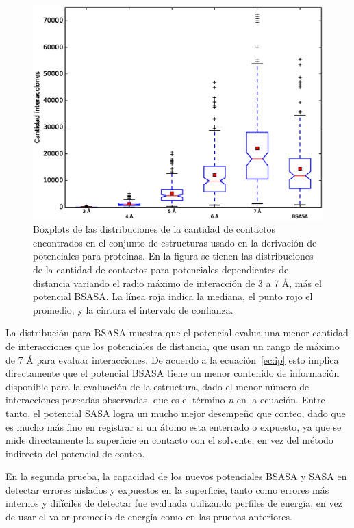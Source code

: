 \begin{figure}[!p]
\centering
\includegraphics[width=\linewidth]{figures/radii_int.eps}
\caption[Boxplots de las distribuciones de la cantidad de contactos encontrados en el conjunto de estructuras usado en la derivación de potenciales para proteínas.]{Boxplots de las distribuciones de la cantidad de contactos encontrados en el conjunto de estructuras usado en la derivación de potenciales para proteínas. En la figura se tienen las distribuciones de la cantidad de contactos para potenciales dependientes de distancia variando el radio máximo de interacción de 3 a 7 \si{\angstrom}, más el potencial BSASA. La línea roja indica la mediana, el punto rojo el promedio, y la cintura el intervalo de confianza.}
\label{fig:radii_int}
\end{figure}
La distribución para BSASA muestra que el potencial evalua una menor cantidad de interacciones que los potenciales de distancia, que usan un rango de máximo de 7 \si{\angstrom} para evaluar interacciones.
De acuerdo a la ecuación~\ref{ec:ip} esto implica directamente que el potencial BSASA tiene un menor contenido de información disponible para la evaluación de la estructura, dado el menor número de interacciones pareadas observadas, que es el término \textit{n} en la ecuación.
Entre tanto, el potencial SASA logra un mucho mejor desempeño que conteo, dado que es mucho más fino en registrar si un átomo esta enterrado o expuesto, ya que se mide directamente la superficie en contacto con el solvente, en vez del método indirecto del potencial de conteo.
\par
En la segunda prueba, la capacidad de los nuevos potenciales BSASA y SASA en detectar errores aislados y expuestos en la superficie, tanto como errores más internos y difíciles de detectar fue evaluada utilizando perfiles de energía, en vez de usar el valor promedio de energía como en las pruebas anteriores.
